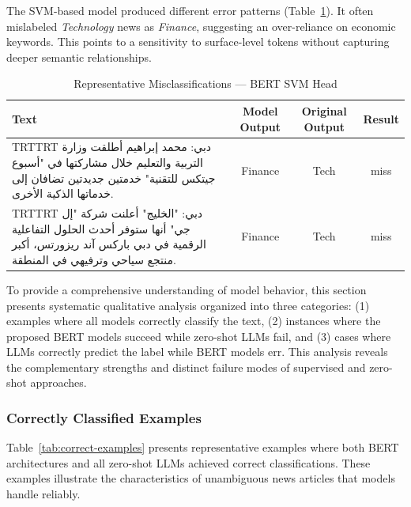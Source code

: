 \documentclass[sn-mathphys-num]{sn-jnl}
\newcommand{\RTL}[1]{%
  \bgroup
  \arabicfont
  \textdir TRT\pardir TRT
  #1%
  \egroup
}
\begin{document}
The SVM-based model produced different error patterns (Table~\ref{tab:model-svm-evaluation}). It often mislabeled \textit{Technology} news as \textit{Finance}, suggesting an over-reliance on economic keywords. This points to a sensitivity to surface-level tokens without capturing deeper semantic relationships.

\begin{table}[h!]
    \centering
    \caption{Representative Misclassifications — BERT SVM Head}
    \label{tab:model-svm-evaluation}
    \begin{tabularx}{\textwidth}{>{\raggedleft\arraybackslash}X c c c}
        \toprule
        \textbf{Text} & \textbf{Model Output} & \textbf{Original Output} & \textbf{Result} \\
        \midrule
        \RTL{دبي: محمد إبراهيم أطلقت وزارة التربية والتعليم خلال مشاركتها في "أسبوع جيتكس للتقنية" خدمتين جديدتين تضافان إلى خدماتها الذكية الأخرى.} &
        Finance & Tech & miss \\
        \addlinespace
        \RTL{دبي: "الخليج" أعلنت شركة "إل جي" أنها ستوفر أحدث الحلول التفاعلية الرقمية في دبي باركس آند ريزورتس، أكبر منتجع سياحي وترفيهي في المنطقة.} &
        Finance & Tech & miss \\
        \bottomrule
    \end{tabularx}
\end{table}


To provide a comprehensive understanding of model behavior, this section presents systematic qualitative analysis organized into three categories: (1) examples where all models correctly classify the text, (2) instances where the proposed BERT models succeed while zero-shot LLMs fail, and (3) cases where LLMs correctly predict the label while BERT models err. This analysis reveals the complementary strengths and distinct failure modes of supervised and zero-shot approaches.

\subsubsection{Correctly Classified Examples}

Table~\ref{tab:correct-examples} presents representative examples where both BERT architectures and all zero-shot LLMs achieved correct classifications. These examples illustrate the characteristics of unambiguous news articles that models handle reliably.
\end{document}
